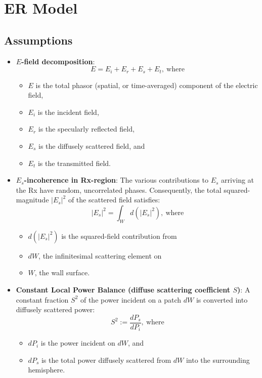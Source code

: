 \documentclass{article}
\begin{document}
\section{ER Model} 
\subsection*{Assumptions}
\begin{itemize}
      \item \textbf{$E$-field decomposition}:
      \begin{equation}
         E = E_i + E_r + E_s + E_t, \ \text{where}
         \label{eq:eDecomp}
      \end{equation}
      \begin{itemize}
         \item $E$ is the total phasor (spatial, or time-averaged) component of the
            electric field,
         \item $E_i$ is the incident field, 
         \item $E_r$ is the specularly reflected field, 
         \item $E_s$ is the diffusely scattered field, and 
         \item $E_t$ is the transmitted field.
      \end{itemize}

   \item \textbf{$E_s$-incoherence in Rx-region}: The various contributions to $E_s$
      arriving at the Rx have random, uncorrelated phases. Consequently, the total
      squared-magnitude $|E_s|^2$ of the scattered field satisfies:
      \begin{equation}
         |E_{s}|^2 = \int_W d(|E_s|^2), \ \text{where}
         \label{eq:incoherence}
      \end{equation}
      \begin{itemize}
         \item $d(|E_s|^2)$ is the squared-field contribution from 
         \item $dW$, the infinitesimal scattering element on 
         \item $W$, the wall surface.

      \end{itemize}
   \item \textbf{Constant Local Power Balance (diffuse scattering coefficient $S$)}: A
      constant fraction $S^2$ of the power incident on a patch $dW$ is converted into
      diffusely scattered power:
      \begin{equation}
         S^2 := \frac{dP_s}{dP_i}, \ \text{where}
         \label{eq:sDef}
      \end{equation}
   \begin{itemize}
      \item $dP_i$ is the power incident on $dW$, and 
      \item $dP_s$ is the total power diffusely scattered from $dW$ into the
         surrounding hemisphere.
   \end{itemize}


\end{itemize}
\end{document}
